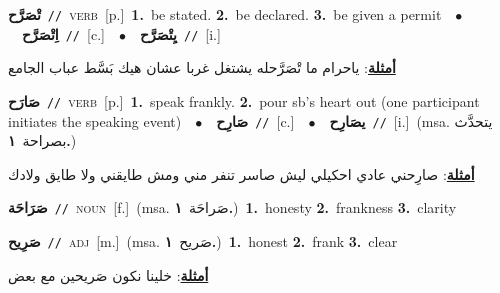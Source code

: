 \documentclass[10pt,a4paper,twoside]{article} %
\begin{document}
\begin{multicols}{2}
{\setlength\topsep{0pt}\textbf{\foreignlanguage{arabic}{تْصَرَّح}}\ {\color{gray}\texttt{//}\color{black}}\ \textsc{verb}\ [p.]\ \textbf{1.}~be stated.  \textbf{2.}~be declared.  \textbf{3.}~be given a permit\ \ $\bullet$\ \ \setlength\topsep{0pt}\textbf{\foreignlanguage{arabic}{اِتْصَرَّح}}\ {\color{gray}\texttt{//}\color{black}}\ [c.]\ \ $\bullet$\ \ \setlength\topsep{0pt}\textbf{\foreignlanguage{arabic}{يِتْصَرَّح}}\ {\color{gray}\texttt{//}\color{black}}\ [i.]\  \begin{flushright}\color{gray}\foreignlanguage{arabic}{\textbf{\underline{\foreignlanguage{arabic}{أمثلة}}}: ياحرام ما تْصَرَّحله يشتغل غربا عشان هيك بَسَّط عباب الجامع}\end{flushright}\color{black}} \vspace{2mm}

{\setlength\topsep{0pt}\textbf{\foreignlanguage{arabic}{صَارَح}}\ {\color{gray}\texttt{//}\color{black}}\ \textsc{verb}\ [p.]\ \textbf{1.}~speak frankly.  \textbf{2.}~pour sb's heart out (one participant initiates the speaking event)\ \ $\bullet$\ \ \setlength\topsep{0pt}\textbf{\foreignlanguage{arabic}{صَارِح}}\ {\color{gray}\texttt{//}\color{black}}\ [c.]\ \ $\bullet$\ \ \setlength\topsep{0pt}\textbf{\foreignlanguage{arabic}{يصَارِح}}\ {\color{gray}\texttt{//}\color{black}}\ [i.]\ \color{gray}(msa. \foreignlanguage{arabic}{يتحدَّث بصراحة}~\foreignlanguage{arabic}{\textbf{١.}})\color{black}\  \begin{flushright}\color{gray}\foreignlanguage{arabic}{\textbf{\underline{\foreignlanguage{arabic}{أمثلة}}}: صارِحني عادي احكيلي ليش صاسر تنفر مني ومش طايقني ولا طايق ولادك}\end{flushright}\color{black}} \vspace{2mm}

{\setlength\topsep{0pt}\textbf{\foreignlanguage{arabic}{صَرَاحَة}}\ {\color{gray}\texttt{//}\color{black}}\ \textsc{noun}\ [f.]\ \color{gray}(msa. \foreignlanguage{arabic}{صَراحَة}~\foreignlanguage{arabic}{\textbf{١.}})\color{black}\ \textbf{1.}~honesty  \textbf{2.}~frankness  \textbf{3.}~clarity\ } \vspace{2mm}

{\setlength\topsep{0pt}\textbf{\foreignlanguage{arabic}{صَرِيح}}\ {\color{gray}\texttt{//}\color{black}}\ \textsc{adj}\ [m.]\ \color{gray}(msa. \foreignlanguage{arabic}{صَريح}~\foreignlanguage{arabic}{\textbf{١.}})\color{black}\ \textbf{1.}~honest  \textbf{2.}~frank  \textbf{3.}~clear\  \begin{flushright}\color{gray}\foreignlanguage{arabic}{\textbf{\underline{\foreignlanguage{arabic}{أمثلة}}}: خلينا نكون صَريحين مع بعض}\end{flushright}\color{black}} \vspace{2mm}


\end{multicols}
\end{document}

